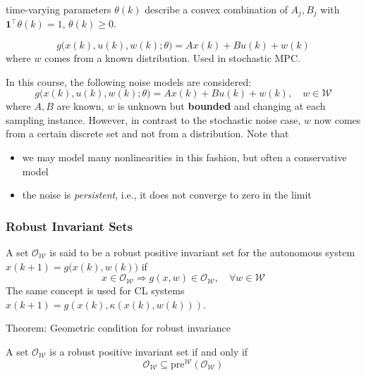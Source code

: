 time-varying parameters $\theta(k)$ describe a convex combination of $A_j , B_j$ with $\mathbf{1}^\top \theta(k) = 1$, $\theta(k) \geq 0$.

\newpar{}

\begin{equation*}
    g\bigl(x(k), u(k), w(k); \theta\bigr) = Ax(k) + Bu(k) + w(k)
\end{equation*}
where $w$ comes from a known distribution. Used in stochastic MPC.

\newpar{}

In this course, the following noise models are considered:
\begin{equation*}
    g\bigl(x(k), u(k), w(k); \theta\bigr) = Ax(k) + Bu(k) + w(k), \quad w \in \mathcal{W}
\end{equation*}
where $A,B$ are known, $w$ is unknown but \textbf{bounded} and changing at each sampling instance. However, in contrast to the stochastic noise case, $w$ now comes from a certain discrete set and not from a distribution.
\newpar{}
Note that
\begin{itemize}
    \item we may model many nonlinearities in this fashion, but often a conservative model
    \item the noise is \textit{persistent}, i.e., it does not converge to zero in the limit
\end{itemize}

\subsubsection{Robust Invariant Sets}

A set $\mathcal{O}_\mathcal{W}$ is said to be a robust positive invariant set for the autonomous system $x(k + 1) = g\bigl(x(k), w(k)\bigr)$ if
\begin{equation*}
    x \in \mathcal{O}_\mathcal{W} \Rightarrow g(x, w) \in \mathcal{O}_\mathcal{W}, \quad \forall w \in \mathcal{W}
\end{equation*}
The same concept is used for CL systems $x(k+1)=g(x(k), \kappa(x(k), w(k)))$.

\newpar{}

Theorem: Geometric condition for robust invariance

A set $\mathcal{O}_\mathcal{W}$ is a robust positive invariant set if and only if
\begin{equation*}
    \mathcal{O}_\mathcal{W} \subseteq \text{pre}^{\mathcal{W}}(\mathcal{O}_\mathcal{W})
\end{equation*}

